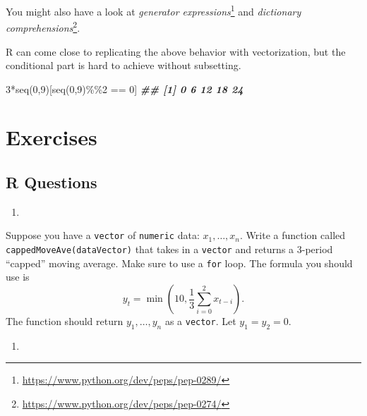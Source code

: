 \documentclass[
  12pt,
  krantz2]{krantz}
\makeatletter
\newenvironment{Shaded}{\begin{snugshade}}{\end{snugshade}}
\newcommand{\DecValTok}[1]{\textcolor[rgb]{0.06,0.06,0.06}{#1}}
\newcommand{\DocumentationTok}[1]{\textcolor[rgb]{0.37,0.37,0.37}{\textbf{\textit{#1}}}}
\newcommand{\FunctionTok}[1]{\textcolor[rgb]{0,0,0}{#1}}
\newcommand{\NormalTok}[1]{#1}
\newcommand{\SpecialCharTok}[1]{\textcolor[rgb]{0,0,0}{#1}}
\providecommand{\tightlist}{%
  \setlength{\itemsep}{0pt}\setlength{\parskip}{0pt}}
\renewcommand{\href}[2]{#2\footnote{\url{#1}}}
\newenvironment{kframe}{%
\medskip{}
\setlength{\fboxsep}{.8em}
 \def\at@end@of@kframe{}%
 \ifinner\ifhmode%
  \def\at@end@of@kframe{\end{minipage}}%
  \begin{minipage}{\columnwidth}%
 \fi\fi%
 \def\FrameCommand##1{\hskip\@totalleftmargin \hskip-\fboxsep
 \colorbox{shadecolor}{##1}\hskip-\fboxsep
     \hskip-\linewidth \hskip-\@totalleftmargin \hskip\columnwidth}%
 \MakeFramed {\advance\hsize-\width
   \@totalleftmargin\z@ \linewidth\hsize
   \@setminipage}}%
 {\par\unskip\endMakeFramed%
 \at@end@of@kframe}
\renewenvironment{Shaded}{\begin{kframe}}{\end{kframe}}
\makeatother
\begin{document}
You might also have a look at \href{https://www.python.org/dev/peps/pep-0289/}{\emph{generator expressions}} and \href{https://www.python.org/dev/peps/pep-0274/}{\emph{dictionary comprehensions}}.

R can come close to replicating the above behavior with vectorization, but the conditional part is hard to achieve without subsetting.

\begin{Shaded}
\begin{Highlighting}[]
\DecValTok{3}\SpecialCharTok{*}\FunctionTok{seq}\NormalTok{(}\DecValTok{0}\NormalTok{,}\DecValTok{9}\NormalTok{)[}\FunctionTok{seq}\NormalTok{(}\DecValTok{0}\NormalTok{,}\DecValTok{9}\NormalTok{)}\SpecialCharTok{\%\%}\DecValTok{2} \SpecialCharTok{==} \DecValTok{0}\NormalTok{]}
\DocumentationTok{\#\# [1]  0  6 12 18 24}
\end{Highlighting}
\end{Shaded}

\hypertarget{exercises-9}{%
\section{Exercises}\label{exercises-9}}

\hypertarget{r-questions-8}{%
\subsection{R Questions}\label{r-questions-8}}

\begin{enumerate}
\def\labelenumi{\arabic{enumi}.}
\tightlist
\item
\end{enumerate}

Suppose you have a \texttt{vector} of \texttt{numeric} data: \(x_1, \ldots, x_n\). Write a function called \texttt{cappedMoveAve(dataVector)} that takes in a \texttt{vector} and returns a 3-period ``capped'' moving average. Make sure to use a \texttt{for} loop. The formula you should use is
\begin{equation} 
y_t = \min\left(10, \frac{1}{3}\sum_{i=0}^2x_{t-i} \right).
\end{equation}
The function should return \(y_1, \ldots, y_n\) as a \texttt{vector}. Let \(y_1 = y_2 = 0\).

\begin{enumerate}
\def\labelenumi{\arabic{enumi}.}
\setcounter{enumi}{1}
\tightlist
\item
\end{enumerate}
\end{document}
